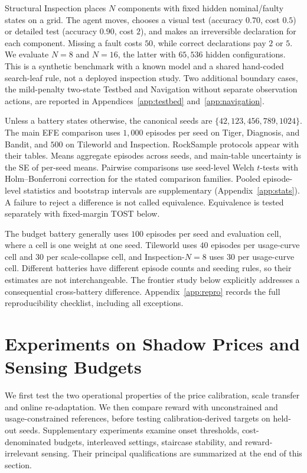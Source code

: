 Structural Inspection places $N$ components with fixed hidden nominal/faulty states on a grid. The agent moves, chooses a visual test (accuracy $0.70$, cost $0.5$) or detailed test (accuracy $0.90$, cost $2$), and makes an irreversible declaration for each component. Missing a fault costs $50$, while correct declarations pay $2$ or $5$. We evaluate $N{=}8$ and $N{=}16$, the latter with $65{,}536$ hidden configurations. This is a synthetic benchmark with a known model and a shared hand-coded search-leaf rule, not a deployed inspection study. Two additional boundary cases, the mild-penalty two-state Testbed and Navigation without separate observation actions, are reported in Appendices~\ref{app:testbed} and~\ref{app:navigation}.

Unless a battery states otherwise, the canonical seeds are $\{42,123,456,789,1024\}$. The main EFE comparison uses $1{,}000$ episodes per seed on Tiger, Diagnosis, and Bandit, and $500$ on Tileworld and Inspection. RockSample protocols appear with their tables. Means aggregate episodes across seeds, and main-table uncertainty is the SE of per-seed means. Pairwise comparisons use seed-level Welch $t$-tests with Holm--Bonferroni correction for the stated comparison families. Pooled episode-level statistics and bootstrap intervals are supplementary (Appendix~\ref{app:stats}). A failure to reject a difference is not called equivalence. Equivalence is tested separately with fixed-margin TOST below.

The budget battery generally uses $100$ episodes per seed and evaluation cell, where a cell is one weight at one seed. Tileworld uses $40$ episodes per usage-curve cell and $30$ per scale-collapse cell, and Inspection-$N{=}8$ uses $30$ per usage-curve cell. Different batteries have different episode counts and seeding rules, so their estimates are not interchangeable. The frontier study below explicitly addresses a consequential cross-battery difference. Appendix~\ref{app:repro} records the full reproducibility checklist, including all exceptions.

\section{Experiments on Shadow Prices and Sensing Budgets}
\label{sec:budget_experiments}

We first test the two operational properties of the price calibration, scale transfer and online re-adaptation. We then compare reward with unconstrained and usage-constrained references, before testing calibration-derived targets on held-out seeds. Supplementary experiments examine onset thresholds, cost-denominated budgets, interleaved settings, staircase stability, and reward-irrelevant sensing. Their principal qualifications are summarized at the end of this section.

